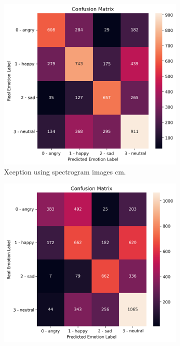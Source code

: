 \begin{figure}[H]
\begin{subfigure}{.5\textwidth}
	\end{subfigure}
	\newline
	\begin{subfigure}{.5\textwidth}
		\centering
		\includegraphics[width=.9\linewidth]{figs/appendix/feature_selection/XSpec.png}
		\caption{Xception using spectrogram images \ac{cm}.}
	\end{subfigure}%
	\begin{subfigure}{.5\textwidth}
		\centering
		\includegraphics[width=.9\linewidth]{figs/appendix/feature_selection/CNNSpec.png}

\end{subfigure}
\end{figure}
